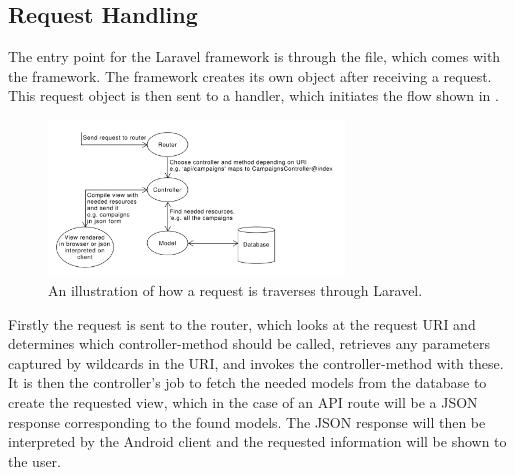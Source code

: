 \subsection{Request Handling}
\label{sub:request_handling}
The entry point for the Laravel framework is through the  file, which comes with the framework. The framework creates its own  object after receiving a request. This request object is then sent to a handler, which initiates the flow shown in .

\begin{figure}[!htbp]
    \centering
    \includegraphics[width=0.7\textwidth]{graphic/architecture/laravel_flow.pdf}
    \caption{An illustration of how a request is traverses through Laravel.}
    \label{fig:laravel_flow}
\end{figure}
\FloatBarrier

Firstly the request is sent to the router, which looks at the request URI and determines which controller-method should be called, retrieves any parameters captured by wildcards in the URI, and invokes the controller-method with these. It is then the controller's job to fetch the needed models from the database to create the requested view, which in the case of an API route will be a JSON response corresponding to the found models. The JSON response will then be interpreted by the Android client and the requested information will be shown to the user. 

